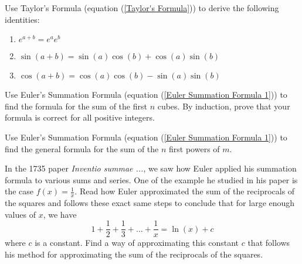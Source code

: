 \begin{exercise}
    Use Taylor's Formula (equation (\ref{Taylor's Formula})) to derive the following identities:
    \begin{enumerate}[label=(\alph*)]
        \item $e^{a+b} = e^ae^b$
        \item $\sin(a+b) = \sin(a)\cos(b) + \cos(a)\sin(b)$
        \item $\cos(a+b) = \cos(a)\cos(b) - \sin(a)\sin(b)$
    \end{enumerate}
\end{exercise}

\begin{exercise}
    Use Euler's Summation Formula (equation (\ref{Euler Summation Formula 1})) to find the formula for the sum of the first $n$ cubes. By induction, prove that your formula is correct for all positive integers.
\end{exercise}

\begin{exercise}
    Use Euler's Summation Formula (equation (\ref{Euler Summation Formula 1})) to find the general formula for the sum of the $n$ first powers of $m$.
\end{exercise}

\begin{exercise} \label{Exercise on Euler-Mascheroni Constant}
    In the 1735 paper \textit{Inventio summae ...}, we saw how Euler applied his summation formula to various sums and series. One of the example he studied in his paper is the case $f(x) = \frac{1}{x}$. Read how Euler approximated the sum of the reciprocals of the squares and follows these exact same steps to conclude that for large enough values of $x$, we have
    $$1 + \frac{1}{2} + \frac{1}{3} + \dots + \frac{1}{x} = \ln(x) + c$$
    where $c$ is a constant. Find a way of approximating this constant $c$ that follows his method for approximating the sum of the reciprocals of the squares.
\end{exercise}